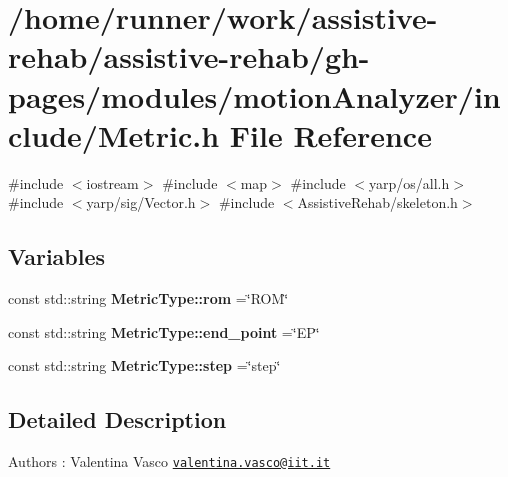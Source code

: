 \section{/home/runner/work/assistive-\/rehab/assistive-\/rehab/gh-\/pages/modules/motion\+Analyzer/include/\+Metric.h File Reference}
\label{Metric_8h}
{\ttfamily \#include $<$iostream$>$}\newline
{\ttfamily \#include $<$map$>$}\newline
{\ttfamily \#include $<$yarp/os/all.\+h$>$}\newline
{\ttfamily \#include $<$yarp/sig/\+Vector.\+h$>$}\newline
{\ttfamily \#include $<$Assistive\+Rehab/skeleton.\+h$>$}\newline
\subsection*{Variables}
\begin{DoxyCompactItemize}
\item 
\mbox{\label{Metric_8h_a134a0ba35a0bfd473142dcba2fa0ac8f}} 
const std\+::string {\bfseries Metric\+Type\+::rom} =\char`\"{}R\+OM\char`\"{}
\item 
\mbox{\label{Metric_8h_ac4580e78dfaef7eb23d717bd230174e4}} 
const std\+::string {\bfseries Metric\+Type\+::end\+\_\+point} =\char`\"{}EP\char`\"{}
\item 
\mbox{\label{Metric_8h_a72bfe667eedeae0fa4a698a4450413d2}} 
const std\+::string {\bfseries Metric\+Type\+::step} =\char`\"{}step\char`\"{}
\end{DoxyCompactItemize}


\subsection{Detailed Description}
\begin{DoxyAuthor}{Authors}
\+: Valentina Vasco \href{mailto:valentina.vasco@iit.it}{\tt valentina.\+vasco@iit.\+it} 
\end{DoxyAuthor}
